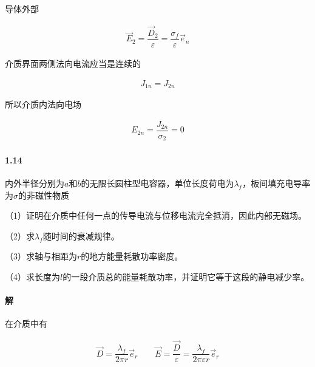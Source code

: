 \documentclass{article}
\begin{document}
导体外部

\begin{equation*}
  \begin{aligned}
    \vec{E}_2 = \dfrac{\vec{D}_2}{\varepsilon} = \dfrac{\sigma_f}{\varepsilon} \vec{e}_n  
  \end{aligned}
\end{equation*}

介质界面两侧法向电流应当是连续的

\begin{equation*}
  \begin{aligned}
    J_{1n} = J_{2n}
  \end{aligned}
\end{equation*}

所以介质内法向电场

\begin{equation*}
  \begin{aligned}
    E_{2n} = \dfrac{J_{2n}}{\sigma_2} = 0 
  \end{aligned}
\end{equation*}

\paragraph{1.14}

内外半径分别为$a$和$b$的无限长圆柱型电容器，单位长度荷电为$\lambda_f$，板间填充电导率为$\sigma$的非磁性物质

（1）证明在介质中任何一点的传导电流与位移电流完全抵消，因此内部无磁场。

（2）求$\lambda_f$随时间的衰减规律。

（3）求轴与相距为$r$的地方能量耗散功率密度。

（4）求长度为$l$的一段介质总的能量耗散功率，并证明它等于这段的静电减少率。

\paragraph{解}

在介质中有

\begin{equation*}
  \begin{aligned}
    \vec{D} = \dfrac{\lambda_f}{2 \pi r} \vec{e}_r
    \quad\quad
    \vec{E} = \dfrac{\vec{D}}{\varepsilon} = \dfrac{\lambda_f}{2 \pi \varepsilon r} \vec{e}_r  
  \end{aligned}
\end{equation*}
\end{document}
